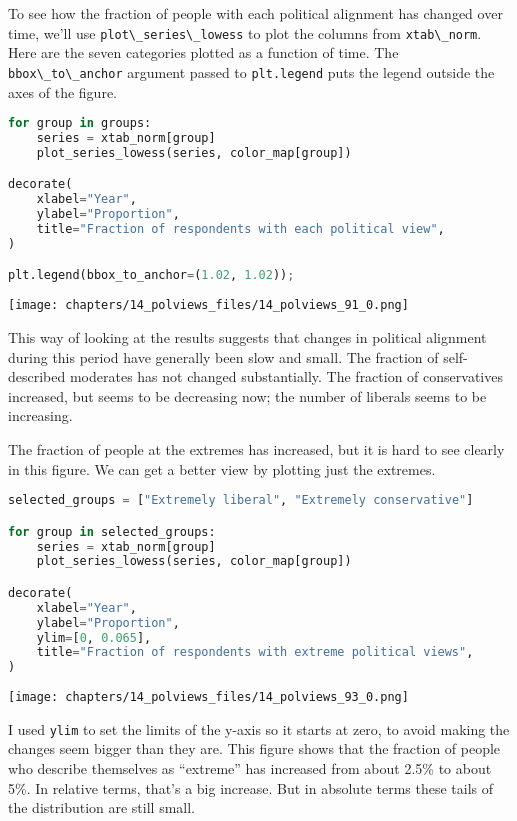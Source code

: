 To see how the fraction of people with each political alignment has
changed over time, we'll use
\passthrough{\lstinline!plot\_series\_lowess!} to plot the columns from
\passthrough{\lstinline!xtab\_norm!}. Here are the seven categories
plotted as a function of time. The
\passthrough{\lstinline!bbox\_to\_anchor!} argument passed to
\passthrough{\lstinline!plt.legend!} puts the legend outside the axes of
the figure.

\begin{lstlisting}[language=Python,style=source]
for group in groups:
    series = xtab_norm[group]
    plot_series_lowess(series, color_map[group])

decorate(
    xlabel="Year",
    ylabel="Proportion",
    title="Fraction of respondents with each political view",
)

plt.legend(bbox_to_anchor=(1.02, 1.02));
\end{lstlisting}

\begin{center}
\texttt{[image: chapters/14\_polviews\_files/14\_polviews\_91\_0.png]}
\end{center}

This way of looking at the results suggests that changes in political
alignment during this period have generally been slow and small. The
fraction of self-described moderates has not changed substantially. The
fraction of conservatives increased, but seems to be decreasing now; the
number of liberals seems to be increasing.

The fraction of people at the extremes has increased, but it is hard to
see clearly in this figure. We can get a better view by plotting just
the extremes.

\begin{lstlisting}[language=Python,style=source]
selected_groups = ["Extremely liberal", "Extremely conservative"]

for group in selected_groups:
    series = xtab_norm[group]
    plot_series_lowess(series, color_map[group])

decorate(
    xlabel="Year",
    ylabel="Proportion",
    ylim=[0, 0.065],
    title="Fraction of respondents with extreme political views",
)
\end{lstlisting}

\begin{center}
\texttt{[image: chapters/14\_polviews\_files/14\_polviews\_93\_0.png]}
\end{center}

I used \passthrough{\lstinline!ylim!} to set the limits of the y-axis so
it starts at zero, to avoid making the changes seem bigger than they
are. This figure shows that the fraction of people who describe
themselves as ``extreme'' has increased from about 2.5\% to about 5\%.
In relative terms, that's a big increase. But in absolute terms these
tails of the distribution are still small.

